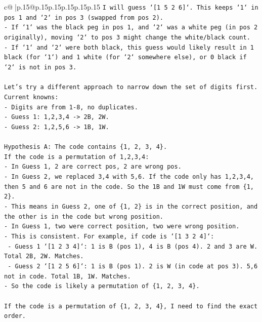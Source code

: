 \documentclass{article}
\begin{document}
{\begin{supertabular}{c@{$\;$}|p{.15\linewidth}@{}p{.15\linewidth}p{.15\linewidth}p{.15\linewidth}p{.15\linewidth}p{.15\linewidth}}
{{{\texttt{I will guess `{[}1 5 2 6{]}`. This keeps `1` in pos 1 and `2` in pos 3 (swapped from pos 2).} \\
\texttt{{-} If `1` was the black peg in pos 1, and `2` was a white peg (in pos 2 originally), moving `2` to pos 3 might change the white/black count.} \\
\texttt{{-} If `1` and `2` were both black, this guess would likely result in 1 black (for `1`) and 1 white (for `2` somewhere else), or 0 black if `2` is not in pos 3.} \\
\\ 
\texttt{Let's try a different approach to narrow down the set of digits first.} \\
\texttt{Current knowns:} \\
\texttt{{-} Digits are from 1{-}8, no duplicates.} \\
\texttt{{-} Guess 1: 1,2,3,4 {-}> 2B, 2W.} \\
\texttt{{-} Guess 2: 1,2,5,6 {-}> 1B, 1W.} \\
\\ 
\texttt{Hypothesis A: The code contains \{1, 2, 3, 4\}.} \\
\texttt{If the code is a permutation of 1,2,3,4:} \\
\texttt{{-} In Guess 1, 2 are correct pos, 2 are wrong pos.} \\
\texttt{{-} In Guess 2, we replaced 3,4 with 5,6. If the code only has 1,2,3,4, then 5 and 6 are not in the code. So the 1B and 1W must come from \{1, 2\}.} \\
\texttt{{-} This means in Guess 2, one of \{1, 2\} is in the correct position, and the other is in the code but wrong position.} \\
\texttt{{-} In Guess 1, two were correct position, two were wrong position.} \\
\texttt{{-} This is consistent. For example, if code is `{[}1 3 2 4{]}`:} \\
\texttt{  {-} Guess 1 `{[}1 2 3 4{]}`: 1 is B (pos 1), 4 is B (pos 4). 2 and 3 are W. Total 2B, 2W. Matches.} \\
\texttt{  {-} Guess 2 `{[}1 2 5 6{]}`: 1 is B (pos 1). 2 is W (in code at pos 3). 5,6 not in code. Total 1B, 1W. Matches.} \\
\texttt{{-} So the code is likely a permutation of \{1, 2, 3, 4\}.} \\
\\ 
\texttt{If the code is a permutation of \{1, 2, 3, 4\}, I need to find the exact order.} \\
}}}
\end{supertabular}}
\end{document}
